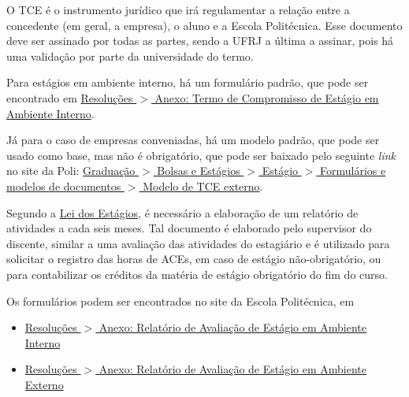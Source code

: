             O TCE é o instrumento jurídico que irá regulamentar a relação entre a concedente (em geral, a empresa), o aluno e a Escola Politécnica. Esse documento deve ser assinado por todas as partes, sendo a UFRJ a última a assinar, pois há uma validação por parte da universidade do termo. 
        
            Para estágios em ambiente interno, há um formulário padrão, que pode ser encontrado em \href{http://www.poli.ufrj.br/arquivos/resolucoes/Anexo_Resolucao_n03de29_05_2013_Modelo_de_TCE_ambiente_interno.pdf}{Resoluções $>$ Anexo: Termo de Compromisso de Estágio em Ambiente Interno}.
        
            Já para o caso de empresas conveniadas, há um modelo padrão, que pode ser usado como base, mas não é obrigatório, que pode ser baixado pelo seguinte \textit{link} no site da Poli:  \href{http://www.poli.ufrj.br/arquivos/estagio/TCE_Externo.doc}{Graduação $>$ Bolsas e Estágios $>$ Estágio $>$ Formulários e modelos de documentos $>$ Modelo de TCE externo}.
        
            Segundo a \href{https://xn--graduao-2wa9a.ufrj.br/images/stories/_pr1/pdf/estagio/lei_do_estagio_11788de2008.pdf}{Lei dos Estágios}, é necessário a elaboração de um relatório de atividades a cada seis meses. Tal documento é elaborado pelo supervisor do discente, similar a uma avaliação das atividades do estagiário e é utilizado para solicitar o registro das horas de ACEs, em caso de estágio não-obrigatório, ou para contabilizar os créditos da matéria de estágio obrigatório do fim do curso.
        
            Os formulários podem ser encontrados no site da Escola Politécnica, em
            
            \begin{itemize}
                \item \href{http://www.poli.ufrj.br/arquivos/resolucoes/Anexo_Resolucao_n03de29052013Relatorio_de_Avaliacao_de_Estagio_ambiente_interno.pdf}{Resoluções $>$ Anexo: Relatório de Avaliação de Estágio em Ambiente Interno}
            
                \item \href{http://www.poli.ufrj.br/arquivos/resolucoes/AnexoResolucao_n03de29052013Relatorio_de_Avaliacao_de\%20Estagio_empresa.pdf}{Resoluções $>$ Anexo: Relatório de Avaliação de Estágio em Ambiente Externo}
            \end{itemize}
            
